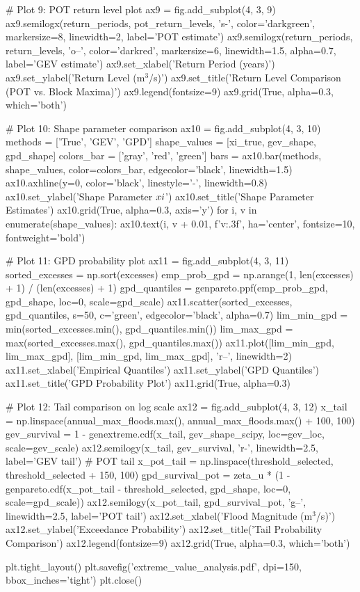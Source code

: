 \documentclass[a4paper, 11pt]{article}
\begin{document}
\begin{pycode}
# Plot 9: POT return level plot
ax9 = fig.add_subplot(4, 3, 9)
ax9.semilogx(return_periods, pot_return_levels, 's-', color='darkgreen', markersize=8,
            linewidth=2, label='POT estimate')
ax9.semilogx(return_periods, return_levels, 'o--', color='darkred', markersize=6,
            linewidth=1.5, alpha=0.7, label='GEV estimate')
ax9.set_xlabel('Return Period (years)')
ax9.set_ylabel('Return Level (m$^3$/s)')
ax9.set_title('Return Level Comparison (POT vs. Block Maxima)')
ax9.legend(fontsize=9)
ax9.grid(True, alpha=0.3, which='both')

# Plot 10: Shape parameter comparison
ax10 = fig.add_subplot(4, 3, 10)
methods = ['True', 'GEV', 'GPD']
shape_values = [xi_true, gev_shape, gpd_shape]
colors_bar = ['gray', 'red', 'green']
bars = ax10.bar(methods, shape_values, color=colors_bar, edgecolor='black', linewidth=1.5)
ax10.axhline(y=0, color='black', linestyle='-', linewidth=0.8)
ax10.set_ylabel('Shape Parameter $\\xi$')
ax10.set_title('Shape Parameter Estimates')
ax10.grid(True, alpha=0.3, axis='y')
for i, v in enumerate(shape_values):
    ax10.text(i, v + 0.01, f'{v:.3f}', ha='center', fontsize=10, fontweight='bold')

# Plot 11: GPD probability plot
ax11 = fig.add_subplot(4, 3, 11)
sorted_excesses = np.sort(excesses)
emp_prob_gpd = np.arange(1, len(excesses) + 1) / (len(excesses) + 1)
gpd_quantiles = genpareto.ppf(emp_prob_gpd, gpd_shape, loc=0, scale=gpd_scale)
ax11.scatter(sorted_excesses, gpd_quantiles, s=50, c='green', edgecolor='black', alpha=0.7)
lim_min_gpd = min(sorted_excesses.min(), gpd_quantiles.min())
lim_max_gpd = max(sorted_excesses.max(), gpd_quantiles.max())
ax11.plot([lim_min_gpd, lim_max_gpd], [lim_min_gpd, lim_max_gpd], 'r--', linewidth=2)
ax11.set_xlabel('Empirical Quantiles')
ax11.set_ylabel('GPD Quantiles')
ax11.set_title('GPD Probability Plot')
ax11.grid(True, alpha=0.3)

# Plot 12: Tail comparison on log scale
ax12 = fig.add_subplot(4, 3, 12)
x_tail = np.linspace(annual_max_floods.max(), annual_max_floods.max() + 100, 100)
gev_survival = 1 - genextreme.cdf(x_tail, gev_shape_scipy, loc=gev_loc, scale=gev_scale)
ax12.semilogy(x_tail, gev_survival, 'r-', linewidth=2.5, label='GEV tail')
# POT tail
x_pot_tail = np.linspace(threshold_selected, threshold_selected + 150, 100)
gpd_survival_pot = zeta_u * (1 - genpareto.cdf(x_pot_tail - threshold_selected,
                                                gpd_shape, loc=0, scale=gpd_scale))
ax12.semilogy(x_pot_tail, gpd_survival_pot, 'g--', linewidth=2.5, label='POT tail')
ax12.set_xlabel('Flood Magnitude (m$^3$/s)')
ax12.set_ylabel('Exceedance Probability')
ax12.set_title('Tail Probability Comparison')
ax12.legend(fontsize=9)
ax12.grid(True, alpha=0.3, which='both')

plt.tight_layout()
plt.savefig('extreme_value_analysis.pdf', dpi=150, bbox_inches='tight')
plt.close()
\end{pycode}
\end{document}
